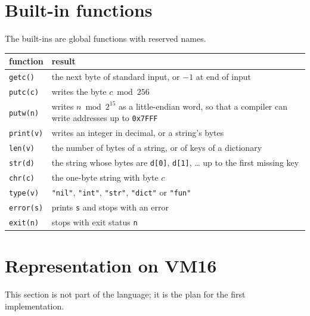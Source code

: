 \documentclass[11pt,a4paper]{article}
\newcommand{\hx}[1]{\texttt{0x#1}}
\newcommand{\vm}{VM16}
\begin{document}
\section{Built-in functions}

The built-ins are global functions with reserved names.

\begin{center}
\small
\begin{tabularx}{\linewidth}{@{}l X@{}}
\toprule
function & result\\
\midrule
\texttt{getc()} & the next byte of standard input, or $-1$ at end of input\\
\texttt{putc(c)} & writes the byte $c \bmod 256$\\
\texttt{putw(n)} & writes $n \bmod 2^{15}$ as a little-endian word, so that
  a compiler can write addresses up to \hx{7FFF}\\
\texttt{print(v)} & writes an integer in decimal, or a string's bytes\\
\texttt{len(v)} & the number of bytes of a string, or of keys of a dictionary\\
\texttt{str(d)} & the string whose bytes are \verb|d[0]|, \verb|d[1]|, \ldots{} up to the first missing key\\
\texttt{chr(c)} & the one-byte string with byte $c$\\
\texttt{type(v)} & \verb|"nil"|, \verb|"int"|, \verb|"str"|, \verb|"dict"| or \verb|"fun"|\\
\texttt{error(s)} & prints \verb|s| and stops with an error\\
\texttt{exit(n)} & stops with exit status \verb|n|\\
\bottomrule
\end{tabularx}
\end{center}

\section{Representation on \vm{}}\label{sec:repr}

This section is not part of the language; it is the plan for the first
implementation.
\end{document}
